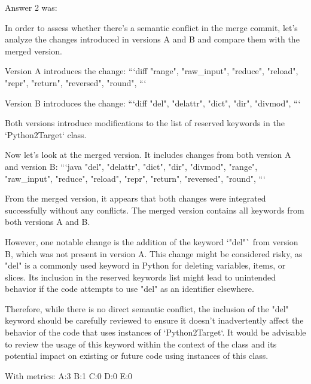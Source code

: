 Answer 2 was:
\begin{spverbatim}
In order to assess whether there's a semantic conflict in the merge commit, let's analyze the changes introduced in versions A and B and compare them with the merged version.

Version A introduces the change:
```diff
                "range", "raw_input", "reduce", "reload", "repr", "return", "reversed", "round",
```

Version B introduces the change:
```diff
                "del", "delattr", "dict", "dir", "divmod",
```

Both versions introduce modifications to the list of reserved keywords in the `Python2Target` class.

Now let's look at the merged version. It includes changes from both version A and version B:
```java
		"del", "delattr", "dict", "dir", "divmod",
		"range", "raw_input", "reduce", "reload", "repr", "return", "reversed", "round",
```

From the merged version, it appears that both changes were integrated successfully without any conflicts. The merged version contains all keywords from both versions A and B.

However, one notable change is the addition of the keyword `"del"` from version B, which was not present in version A. This change might be considered risky, as "del" is a commonly used keyword in Python for deleting variables, items, or slices. Its inclusion in the reserved keywords list might lead to unintended behavior if the code attempts to use "del" as an identifier elsewhere.

Therefore, while there is no direct semantic conflict, the inclusion of the "del" keyword should be carefully reviewed to ensure it doesn't inadvertently affect the behavior of the code that uses instances of `Python2Target`. It would be advisable to review the usage of this keyword within the context of the class and its potential impact on existing or future code using instances of this class.  
\end{spverbatim}

With metrics:
A:3
B:1
C:0
D:0
E:0


